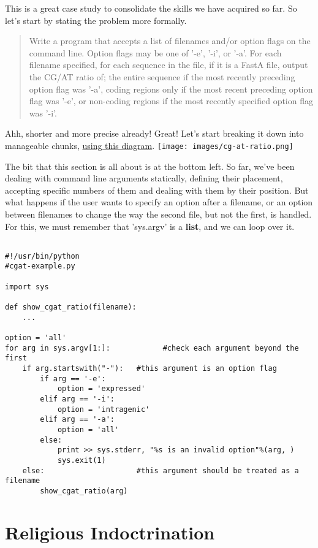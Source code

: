 \documentclass[a4paper,11pt]{article}
\begin{document}
This is a great case study to consolidate the skills we have   acquired so far. So let's start by stating the problem more   formally.
\begin{quotation}     Write a program that accepts a list of filenames and/or option    flags on the command line. Option flags may be one of '-e', '-i',    or '-a'. For each filename specified, for each sequence in the    file, if it is a FastA file, output the CG/AT ratio of; the entire    sequence if the most recently preceding option flag was '-a',    coding regions only if the most recent preceding option flag was    '-e', or non-coding regions if the most recently specified option    flag was '-i'.    
\end{quotation}

Ahh, shorter and more precise already! Great! Let's start breaking   it down into manageable chunks, \href{data/cg-at-ratio.png}{using   this diagram}.
\texttt{[image: images/cg-at-ratio.png]}

The bit that this section is all about is at the bottom left. So   far, we've been dealing with command line arguments statically,   defining their placement, accepting specific numbers of them and   dealing with them by their position. But what happens if the user wants   to specify an option after a filename, or an option between filenames   to change the way the second file, but not the first, is handled. For   this, we must remember that 'sys.argv' is a \textbf{list}, and   we can loop over it.
\begin{lstlisting}

#!/usr/bin/python
#cgat-example.py

import sys

def show_cgat_ratio(filename):
    ...

option = 'all'
for arg in sys.argv[1:]:			#check each argument beyond the first
    if arg.startswith("-"):	  #this argument is an option flag
        if arg == '-e':
            option = 'expressed'
        elif arg == '-i':
            option = 'intragenic'
        elif arg == '-a':
            option = 'all'
        else:
            print >> sys.stderr, "%s is an invalid option"%(arg, )
            sys.exit(1)
    else:                     #this argument should be treated as a filename
        show_cgat_ratio(arg)
\end{lstlisting}

\section{Religious Indoctrination}
\end{document}

